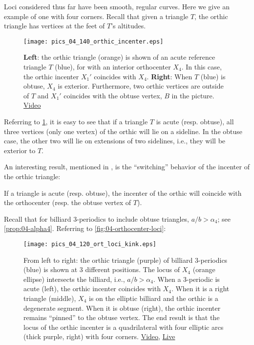 Loci considered thus far have been smooth, regular curves. Here we give an example of one with four corners. Recall that given a triangle $T$, the orthic triangle has vertices at the feet of $T$'s altitudes.

\begin{figure}
    \centering
    \texttt{[image: pics\_04\_140\_orthic\_incenter.eps]}
    \caption{\textbf{Left}: the orthic triangle (orange) is shown of an acute reference triangle $T$ (blue), for with an interior orthocenter $X_4$. In this case, the orthic incenter $X_1'$ coincides with $X_4$. \textbf{Right}: When $T$ (blue) is obtuse, $X_4$ is exterior. Furthermore, two orthic vertices are outside of $T$ and $X_1'$ coincides with the obtuse vertex, $B$ in the picture. \href{https://youtu.be/-bLuvICzmqM}{Video}}
    \label{fig:04-orthic-incenter}
\end{figure}

Referring to \cref{fig:04-orthic-incenter}, 
it is easy to see that if a triangle $T$ is acute (resp. obtuse), all three vertices (only one vertex) of the orthic will lie on a sideline. In the obtuse case, the other two will lie on extensions of two sidelines, i.e., they will be exterior to $T$.

An interesting result, mentioned in \cite[Chapter 1]{coxeter67}, is the ``switching'' behavior of the incenter of the orthic triangle:

\begin{lemma}
If a triangle is acute (resp. obtuse), the incenter of the orthic will coincide with the orthocenter (resp. the obtuse vertex of $T$).
\label{lem:04-pinned}
\end{lemma}

Recall that for billiard 3-periodics to include obtuse triangles, $a/b>\alpha_4$; see \cref{prop:04-alpha4}. Referring to
\cref{fig:04-orthocenter-loci}:

\begin{figure}
    \centering
    \texttt{[image: pics\_04\_120\_ort\_loci\_kink.eps]}
    \caption{From left to right: the orthic triangle (purple) of billiard 3-periodics (blue) is shown at 3 different positions. The locus of $X_4$ (orange ellipse) intersects the billiard, i.e., $a/b>\alpha_4$. When a 3-periodic is acute (left), the orthic incenter coincides with $X_4$. When it is a right triangle (middle), $X_4$ is on the elliptic billiard and the orthic is a degenerate segment. When it is obtuse (right), the orthic incenter remains ``pinned'' to the obtuse vertex. The end result is that the locus of the orthic incenter is a quadrilateral with four elliptic arcs (thick purple, right) with four corners.  \href{https://youtu.be/3qJnwpFkUFQ}{Video}, \href{https://bit.ly/33TVjit}{Live}}
    \label{fig:04-orthic_incenter_locus}
\end{figure}

